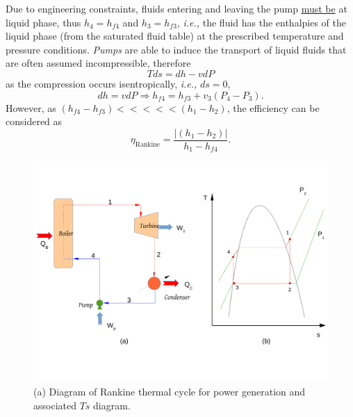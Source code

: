 \documentclass[12pts,a4paper,amsmath,amssymb,floatfix]{article}%
\newcommand{\frc}{\displaystyle\frac}
\newcommand{\ie}{{\it i.e., }}
\begin{document}
     Due to engineering constraints, fluids entering and leaving the pump \underline{must be} at liquid phase, thus $h_{4}=h_{f4}$ and $h_{3}=h_{f3}$, \ie the fluid has the enthalpies of the liquid phase (from the saturated fluid table) at the prescribed temperature and pressure conditions. {\it Pumps} are able to induce the transport of liquid fluids that are often assumed incompressible, therefore
          \begin{displaymath}
                Tds = dh - v dP
          \end{displaymath}
as the compression occurs isentropically, \ie $ds=0$,
          \begin{displaymath}
                dh = v dP \Rightarrow h_{f4} = h_{f3} + v_{3}\left(P_{4}-P_{3}\right).
          \end{displaymath}
However, as $\left(h_{f4}-h_{f3}\right) <<<<< \left(h_{1}-h_{2}\right)$, the efficiency can be considered as
           \begin{displaymath}
               \eta_{\text{Rankine}} = \frc{\left|\left(h_{1}-h_{2}\right)\right|}{h_{1}-h_{f4}}.
           \end{displaymath}     
%
   \begin{figure}[h]
      \begin{center}
         \includegraphics[width=\columnwidth,clip]{./Figs/Mod3PowerSystemDiagram}
      \end{center}
      \caption{ (a) Diagram of Rankine thermal cycle for power generation and associated $Ts$ diagram.}\label{Mod03Fig04}
   \end{figure}
\end{document}
